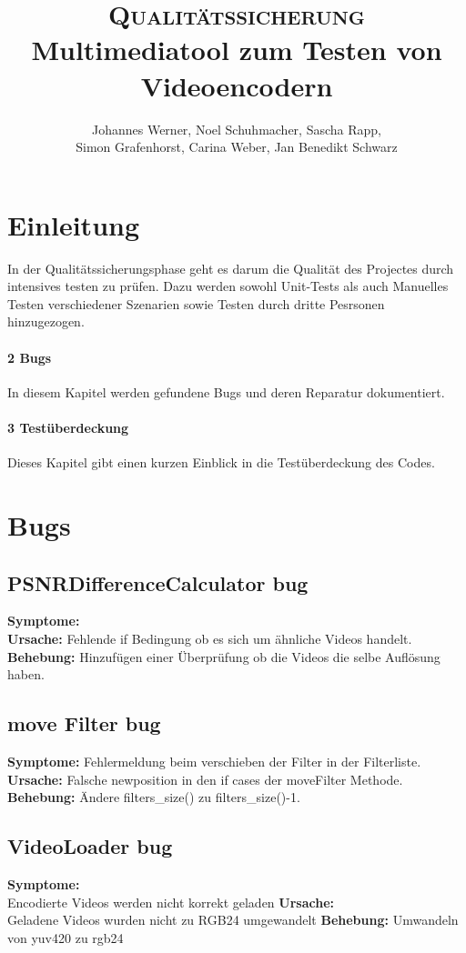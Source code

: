 \documentclass{scrartcl}
\title{\fontsize{40}{48} \selectfont \textsc{Qualitätssicherung}\\
{\fontsize{18}{18} \selectfont Multimediatool zum Testen von Videoencodern}}}
\author {Johannes Werner, Noel Schuhmacher, Sascha Rapp,\\ Simon Grafenhorst,
Carina Weber, Jan Benedikt Schwarz}
\begin{document}
 {
\maketitle
\thispagestyle{empty}
\pagestyle{empty}
\newpage
\setcounter{page}{0}
\tableofcontents
\clearpage
\pagestyle{plain}
\newpage
\section{Einleitung}
In der Qualitätssicherungsphase geht es darum die Qualität des Projectes  durch intensives testen zu prüfen. Dazu werden sowohl Unit-Tests als auch Manuelles Testen verschiedener Szenarien sowie Testen durch dritte Pesrsonen hinzugezogen.
\paragraph{2 Bugs} In diesem Kapitel werden gefundene Bugs und deren Reparatur dokumentiert.
\paragraph{3 Testüberdeckung} Dieses Kapitel gibt einen kurzen Einblick in die Testüberdeckung des Codes.
\newpage
\section{Bugs}
\subsection{PSNRDifferenceCalculator bug}
\textbf{Symptome:}\\
\textbf{Ursache:} Fehlende if Bedingung ob es sich um ähnliche Videos handelt.\\
\textbf{Behebung:} Hinzufügen einer Überprüfung ob die Videos die selbe Auflösung haben.
\subsection{move Filter bug}
\textbf{Symptome:} Fehlermeldung beim verschieben der Filter in der Filterliste.\\
\textbf{Ursache:} Falsche newposition in den if cases der moveFilter Methode.\\
\textbf{Behebung:} Ändere filters\_size() zu filters\_size()-1.
\subsection{VideoLoader bug}
\textbf{Symptome:}\\
Encodierte Videos werden nicht korrekt geladen
\textbf{Ursache:}\\
Geladene Videos wurden nicht zu RGB24 umgewandelt
\textbf{Behebung:}
Umwandeln von yuv420 zu rgb24
}
\end{document}

